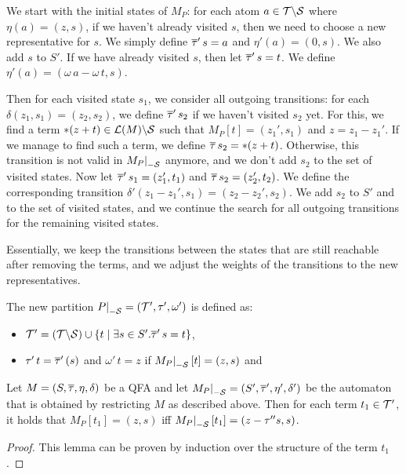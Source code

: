 We start with the initial states of $M_P$:
for each atom $a \in \mathcal{T} \backslash \mathcal{S}$ where $\eta(a) = (z, s)$, if we haven't already visited $s$, then we need to choose a new representative for $s$. We simply define $\overline{\tau}'\,s = a$ and $\eta'(a) = (0, s)$.
We also add $s$ to $S'$.
If we have already visited $s$, then let $\overline{\tau}'\,s = t$. We define $\eta'(a) = (\omega\,a - \omega\,t, s)$.

Then for each visited state $s_1$, we consider all outgoing transitions: for each $\delta(z_1, s_1) = (z_2, s_2)$,
we define $\overline{\tau}'\,s_2$ if we haven't visited $s_2$ yet.
For this, we find a term $*(z+t)\in \mathcal{L}(M)\backslash \mathcal{S}$ such that $M_P[t] = (z_1', s_1)$ and $z = z_1 - z_1'$.
If we manage to find such a term, we define $\overline{\tau}\,s_2 = *(z+t)$.
Otherwise, this transition is not valid in $\restr{M_P}{-\Set}$ anymore, and we don't add $s_2$ to the set of visited states.
Now let $\overline{\tau}'\,s_1 = (z_1', t_1)$ and $\overline{\tau}\,s_2 = (z_2', t_2)$.
We define the corresponding transition $\delta'(z_1 - z_1', s_1) = (z_2 - z_2', s_2)$.
We add $s_2$ to $S'$ and to the set of visited states, and we continue the search for all outgoing transitions for the remaining visited states.

Essentially, we keep the transitions between the states that are still reachable after removing the terms, and we adjust the weights of the transitions to the new representatives.

The new partition $\restr{P}{-\Set} = (\T', \tau', \omega')$ is defined as:
\begin{itemize}
    \item $\mathcal{T}' = (\mathcal{T} \backslash \mathcal{S}) \cup \{t \mid \exists s \in S' . \overline{\tau}'\,s = t\}$,
    \item $\tau'\,t = \overline{\tau}'\,(s)$ and $\omega'\,t = z$ if $\restr{M_P}{-\Set}[t] = (z,s)$ and
\end{itemize}

\begin{lemma}\label{restriction}
    Let $M = (S, \overline{\tau}, \eta, \delta)$ be a QFA and let $\restr{M_P}{-\Set} = (S', \otau', \eta', \delta')$ be the automaton that is obtained by restricting $M$ as described above.
    Then for each term $t_1 \in \mathcal{T}'$, it holds that $M_P[t_1] = (z, s)$ iff $\restr{M_P}{-\Set}[t_1] = (z - \repr s, s)$.
\end{lemma}
\begin{proof}
    This lemma can be proven by induction over the structure of the term $t_1$.
\end{proof}


